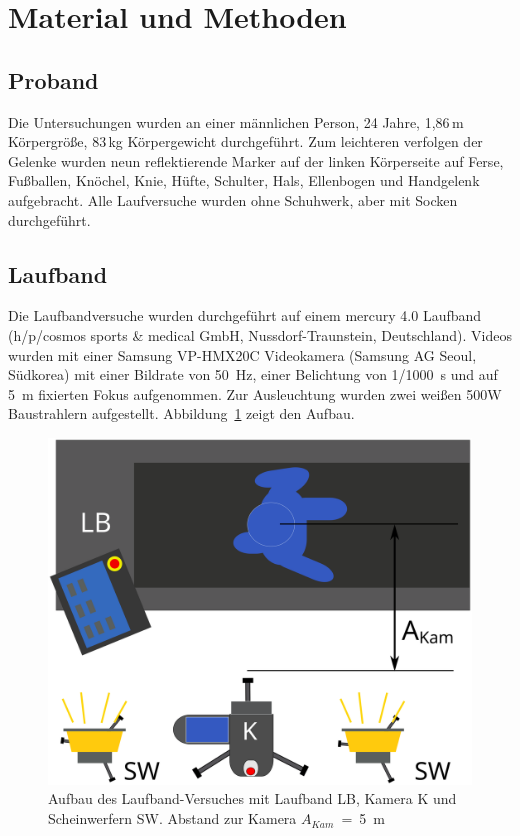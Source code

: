 \section{Material und Methoden}
%
%

\subsection{Proband}
Die Untersuchungen wurden an einer männlichen Person, 24 Jahre, 1,86\,m Körpergröße, 83\,kg Körpergewicht durchgeführt. Zum leichteren verfolgen der Gelenke wurden neun reflektierende Marker auf der linken Körperseite auf Ferse, Fußballen, Knöchel, Knie, Hüfte, Schulter, Hals, Ellenbogen und Handgelenk aufgebracht. Alle Laufversuche wurden ohne Schuhwerk, aber mit Socken durchgeführt.

\subsection{Laufband}
Die Laufbandversuche wurden durchgeführt auf einem mercury 4.0 Laufband (h/p/cosmos sports \& medical GmbH, Nussdorf-Traunstein, Deutschland). Videos wurden mit einer Samsung VP-HMX20C Videokamera (Samsung AG Seoul, Südkorea) mit einer Bildrate von 50~Hz, einer Belichtung von 1/1000~s und auf 5~m fixierten Fokus aufgenommen. 
Zur Ausleuchtung wurden zwei weißen 500W Baustrahlern aufgestellt. Abbildung~\ref{fig:laufbnd_stp} zeigt den Aufbau.\\
\begin{figure}
	\includegraphics[width=\linewidth]{bilder/mat_met/Laufband_setup}
	\caption[Aufbau Laufband Versuch]{Aufbau des Laufband-Versuches mit Laufband LB, Kamera K und Scheinwerfern SW. Abstand zur Kamera $A_{Kam}$~=~5~m }
	\label{fig:laufbnd_stp}
\end{figure}

